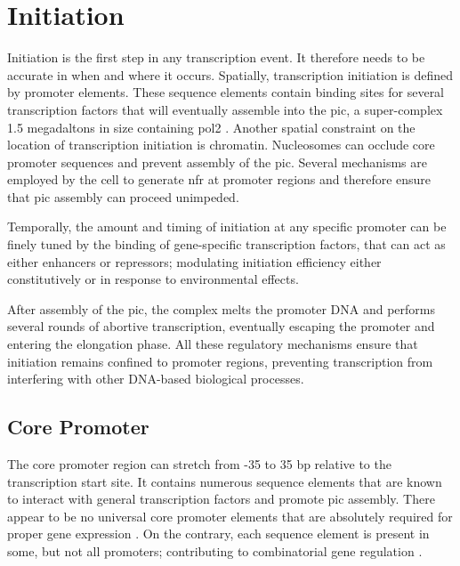 \section{Initiation}

Initiation is the first step in any transcription event. It therefore needs to be accurate in when and where it occurs. 
Spatially, transcription initiation is defined by promoter elements.
These sequence elements contain binding sites for several transcription factors that will eventually assemble into the \gls{pic}, a super-complex 1.5 megadaltons in size  containing \gls{pol2} \cite{fazal:2015:real-time}.
Another spatial constraint on the location of transcription initiation is chromatin. 
Nucleosomes can occlude core promoter sequences and prevent assembly of the \gls{pic}.
Several mechanisms are employed by the cell to generate \gls{nfr} at promoter regions and therefore ensure that \gls{pic} assembly can proceed unimpeded.

Temporally, the amount and timing of initiation at any specific promoter can be finely tuned by the binding of gene-specific transcription factors, that can act as either enhancers or repressors; modulating initiation efficiency either constitutively or in response to environmental effects. 

After assembly of the \gls{pic}, the complex melts the promoter DNA and performs several rounds of abortive transcription, eventually escaping the promoter and entering the elongation phase.
All these regulatory mechanisms ensure that initiation remains confined to promoter regions, preventing transcription from interfering with other DNA-based biological processes.

\subsection{Core Promoter}

The core promoter region can stretch from -35 to 35 \gls{bp} relative to the transcription start site. 
It contains numerous sequence elements that are known to interact with general transcription factors and promote \gls{pic} assembly. 
There appear to be no universal core promoter elements that are absolutely required for proper gene expression \cite{butler:2002:RNA}.
On the contrary, each sequence element is present in some, but not all promoters; contributing to combinatorial gene regulation \cite{smale:2001:core}.


